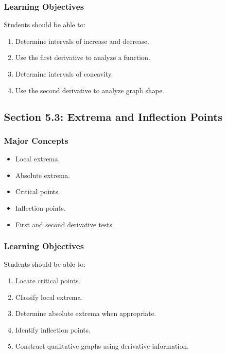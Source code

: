 \documentclass[11pt]{article}
\begin{document}
\subsubsection{Learning Objectives}

Students should be able to:

\begin{enumerate}
    \item Determine intervals of increase and decrease.
    \item Use the first derivative to analyze a function.
    \item Determine intervals of concavity.
    \item Use the second derivative to analyze graph shape.
\end{enumerate}

\subsection{Section 5.3: Extrema and Inflection Points}

\subsubsection{Major Concepts}

\begin{itemize}
    \item Local extrema.
    \item Absolute extrema.
    \item Critical points.
    \item Inflection points.
    \item First and second derivative tests.
\end{itemize}

\subsubsection{Learning Objectives}

Students should be able to:

\begin{enumerate}
    \item Locate critical points.
    \item Classify local extrema.
    \item Determine absolute extrema when appropriate.
    \item Identify inflection points.
    \item Construct qualitative graphs using derivative information.
\end{enumerate}
\end{document}
